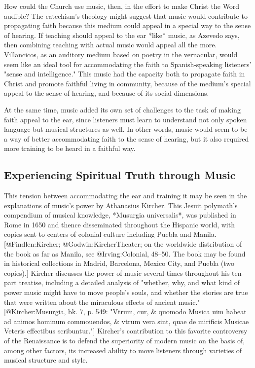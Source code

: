 How could the Church use music, then, in the effort to make Christ the Word
audible?
The catechism's theology might suggest that music would contribute to
propagating faith because this medium could appeal in a special way to the sense
of hearing. If teaching should appeal to the ear *like* music, as Azevedo says,
then combining teaching with actual music would appeal all the more.
Villancicos, as an auditory medium based on poetry in the vernacular, would seem
like an ideal tool for accommodating the faith to Spanish-speaking listeners'
"sense and intelligence." 
This music had the capacity both to propagate faith in Christ and promote faithful
living in community, because of the medium's special appeal to the sense of
hearing, and because of its social dimensions.

At the same time, music added its own set of challenges to the task of making
faith appeal to the ear, since listeners must learn to understand not only
spoken language but musical structures as well. 
In other words, music would seem to be a way of better accommodating faith
to the sense of hearing, but it also required more training to be heard in a
faithful way. 


\subsection{Experiencing Spiritual Truth through Music}


This tension between accommodating the ear and training it may be seen in the
explanations of music's power by Athanasius Kircher. 
This Jesuit polymath's compendium of musical knowledge, *Musurgia universalis*,
was published in Rome in 1650 and thence disseminated throughout the Hispanic
world, with copies sent to centers of colonial culture including Puebla and
Manila. 
[@Findlen:Kircher; @Godwin:KircherTheater; on the worldwide distribution
of the book as far as Manila, see @Irving:Colonial, 48--50. The book may be
found in historical collections in Madrid, Barcelona, Mexico City, and Puebla
(two copies).]
Kircher discusses the power of music several times throughout his ten-part
treatise, including a detailed analysis of "whether, why, and what kind of power
music might have to move people's souls, and whether the stories are true that
were written about the miraculous effects of ancient music." 
[@Kircher:Musurgia, bk. 7, p. 549: 
"Vtrum, cur, & quomodo Musica uim habeat ad animos hominum commouendos, & vtrum
vera sint, quae de mirificis Musicae Veteris effectibus scribuntur."]
Kircher's contribution to this favorite controversy of the Renaissance is to
defend the superiority of modern music on the basis of, among other factors, its
increased ability to move listeners through varieties of musical structure and
style. 

